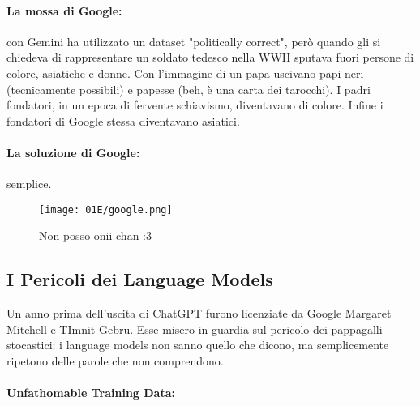 
\paragraph{La mossa di Google:} con Gemini ha utilizzato un dataset "politically correct", però quando gli si chiedeva di rappresentare un soldato tedesco nella WWII sputava fuori persone di colore, asiatiche e donne. Con l'immagine di un papa uscivano papi neri (tecnicamente possibili) e papesse (beh, è una carta dei tarocchi). I padri fondatori, in un epoca di fervente schiavismo, diventavano di colore. Infine i fondatori di Google stessa diventavano asiatici.

\paragraph{La soluzione di Google:} semplice.

\begin{figure}[H]
    \centering
    \texttt{[image: 01E/google.png]}
    \caption{Non posso onii-chan :3}
\end{figure}



\subsection{I Pericoli dei Language Models}

Un anno prima dell'uscita di ChatGPT furono licenziate da Google Margaret Mitchell e TImnit Gebru. Esse misero in guardia sul pericolo dei pappagalli stocastici: i language models non sanno quello che dicono, ma semplicemente ripetono delle parole che non comprendono. 

\paragraph{Unfathomable Training Data:}

